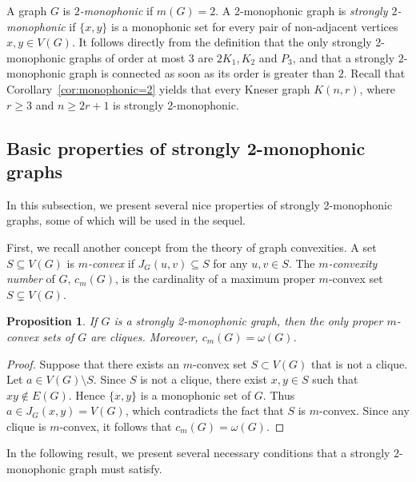 \documentclass[a4paper,11pt]{article}
\newtheorem{proposition}[theorem]{Proposition}
\begin{document}
A graph $G$ is \emph{$2$-monophonic} if $m(G)=2$. A 2-monophonic graph is \emph{strongly $2$-monophonic} if $\{x,y\}$ is a monophonic set for every pair of non-adjacent vertices $x,y \in V(G)$. It follows directly from the definition that the only strongly 2-monophonic graphs of order at most 3 are $2K_1,K_2$ and $P_3$, and that a strongly $2$-monophonic graph is connected as soon as its order is greater than $2$.
Recall that Corollary~\ref{cor:monophonic=2} yields that every Kneser graph $K(n,r)$, where $r\ge 3$ and $n\ge 2r+1$ is strongly 2-monophonic.

\subsection{Basic properties of strongly 2-monophonic graphs}

In this subsection, we present several nice properties of strongly 2-monophonic graphs, some of which will be used in the sequel.

First, we recall another concept from the theory of graph convexities. A set $S \subseteq V(G)$ is {\em $m$-convex} if $J_G(u,v) \subseteq S$ for any $u,v \in S$. The {\it $m$-convexity number} of $G$, $c_m(G)$, is the cardinality of a maximum proper $m$-convex set $S \subsetneq V(G)$.

\begin{proposition}\label{prop:convexSets}
    If $G$ is a strongly 2-monophonic graph, then the only proper $m$-convex sets of $G$ are cliques. Moreover, $c_m(G)=\omega(G)$. 
\end{proposition}
\begin{proof}
     Suppose that there exists an $m$-convex set $S \subset V(G)$ that is not a clique. Let $a \in V(G) \setminus S$. Since $S$ is not a clique, there exist $x,y \in S$ such that $xy \notin E(G)$. Hence $\{x,y\}$ is a monophonic set of $G$. Thus $a \in J_G(x,y)=V(G)$, which contradicts the fact that $S$ is $m$-convex. Since any clique is $m$-convex, it follows that $c_m(G)=\omega(G)$.
\end{proof}

In the following result, we present several necessary conditions that a strongly $2$-monophonic graph must satisfy.
\end{document}
